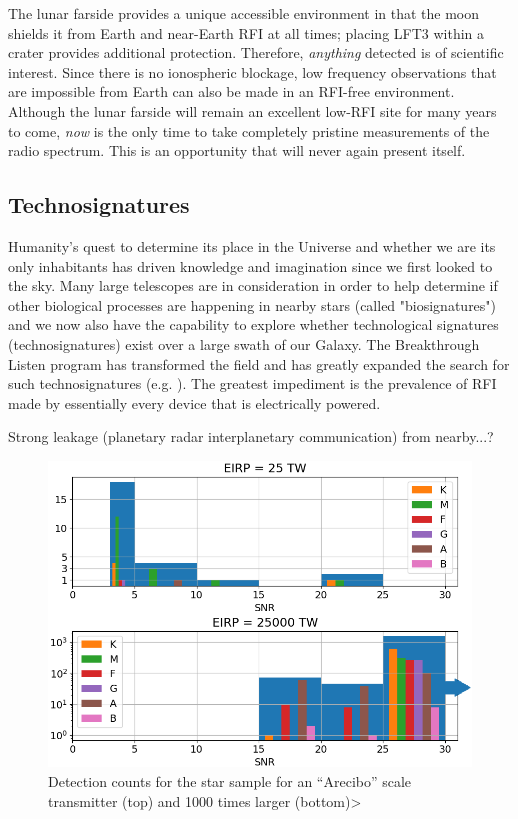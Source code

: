 The lunar farside provides a unique accessible environment in that the moon shields it from Earth and near-Earth RFI at all times; placing LFT3 within a crater provides additional protection. Therefore, {\em anything} detected is of scientific interest. Since there is no ionospheric blockage, low frequency observations that are impossible from Earth can also be made in an RFI-free environment. Although the lunar farside will remain an excellent low-RFI site for many years to come, {\em now} is the only time to take completely pristine measurements of the radio spectrum. This is an opportunity that will never again present itself.

\subsection{Technosignatures}
Humanity's quest to determine its place in the Universe and whether we are its only inhabitants has driven knowledge and imagination since we first looked to the sky.  Many large telescopes are in consideration in order to help determine if other biological processes are happening in nearby stars (called "biosignatures") and we now also have the capability to explore whether technological signatures (technosignatures) exist over a large swath of our Galaxy.  The Breakthrough Listen program has transformed the field and has greatly expanded the search for such technosignatures (e.g. \citealt{Enriquez_2017, Price_2020, Gajjar_2021}).  The greatest impediment is the prevalence of RFI made by essentially every device that is electrically powered.

Strong leakage (planetary radar interplanetary communication) from nearby...?
\begin{figure}
    \centering
    \includegraphics[width=0.75\linewidth]{figures/isaaccounts.png}
    \caption{Detection counts for the \cite{isaacsonetal} star sample for an ``Arecibo'' scale transmitter (top) and 1000 times larger (bottom)>}
    \label{fig:isaacsonetal}
\end{figure}


